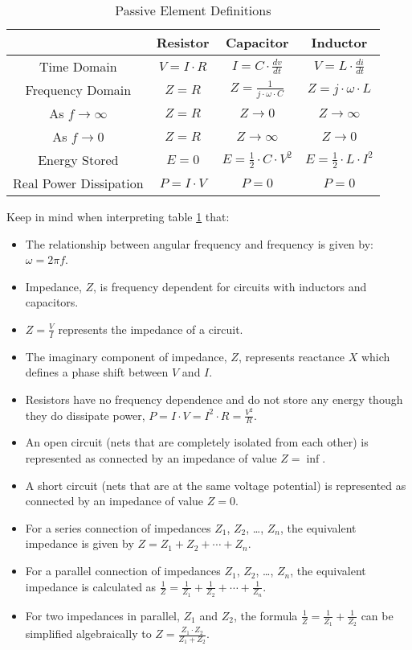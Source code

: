 \documentclass[main.tex]{subfiles}
\begin{document}
\begin{table}[H]
    \centering
    \begin{tabular}{|c|c|c|c|}
        \hline
        & Resistor & Capacitor & Inductor \\ \hline
        Time Domain & $V = I \cdot R$ & $I = C \cdot \frac{dv}{dt}$ & $V = L \cdot \frac{di}{dt}$ \\ \hline
        Frequency Domain & $Z = R$ & $Z = \frac{1}{j \cdot \omega \cdot C}$ & $Z = j \cdot \omega \cdot L$ \\ \hline
        As $f \to \infty$ & $Z = R$ & $Z \to 0$ & $Z \to \infty$ \\ \hline
        As $f \to 0$ & $Z = R$ & $Z \to \infty$ & $Z \to 0$ \\ \hline
        Energy Stored & $E = 0$ & $E = \frac{1}{2} \cdot C \cdot V^{2}$ & $E = \frac{1}{2} \cdot L \cdot I^{2}$ \\ \hline
        Real Power Dissipation & $P = I \cdot V$ & $P = 0$ & $P = 0$ \\ \hline
    \end{tabular}
    \caption{Passive Element Definitions}
    \label{tab:passive_definitions}
\end{table}

\noindent Keep in mind when interpreting table \ref{tab:passive_definitions} that:
\begin{itemize}
    \item The relationship between angular frequency and frequency is given by: $\omega = 2 \pi f$.
    \item Impedance, $Z$, is frequency dependent for circuits with inductors and capacitors.
    \item $Z = \frac{V}{I}$ represents the impedance of a circuit. 
    \item The imaginary component of impedance, $Z$, represents reactance $X$ which defines a phase shift between $V$ and $I$.
    \item Resistors have no frequency dependence and do not store any energy though they do dissipate power, $P = I \cdot V = I^{2} \cdot R = \frac{V^2}{R}$.
    \item An open circuit (nets that are completely isolated from each other) is represented as connected by an impedance of value $Z = \inf$.
    \item A short circuit (nets that are at the same voltage potential) is represented as connected by an impedance of value $Z = 0$. 
    \item For a series connection of impedances $Z_1$, $Z_2$, \dots, $Z_n$, the equivalent impedance is given by $Z = Z_1 + Z_2 + \cdots + Z_n$.
    \item For a parallel connection of impedances $Z_1$, $Z_2$, \dots, $Z_n$, the equivalent impedance is calculated as $\frac{1}{Z} = \frac{1}{Z_1} + \frac{1}{Z_2} + \cdots + \frac{1}{Z_n}$.
    \item For two impedances in parallel, $Z_1$ and $Z_2$, the formula $\frac{1}{Z} = \frac{1}{Z_1} + \frac{1}{Z_2}$ can be simplified algebraically to $Z = \frac{Z_1 \cdot Z_2}{Z_1 + Z_2}$. 
\end{itemize}
\end{document}
